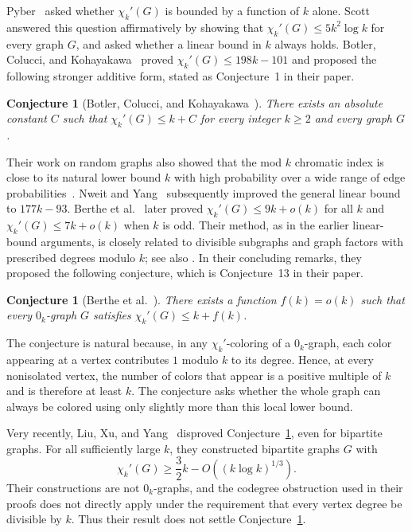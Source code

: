 \documentclass[11pt]{article}
\newtheorem{conjecture}[theorem]{Conjecture}
\newcommand{\chik}{\chi_k'}
\begin{document}
Pyber~\cite{Pyber1992} asked whether $\chik(G)$ is bounded by a function
of $k$ alone. Scott~\cite{Scott1997} answered this question affirmatively
by showing that $\chik(G)\leq5k^2\log k$ for every graph $G$, and asked
whether a linear bound in $k$ always holds. Botler, Colucci, and
Kohayakawa~\cite{BotlerColucciKohayakawa2023} proved
$\chik(G)\leq198k-101$ and proposed the following stronger additive
form, stated as Conjecture~1 in their paper.

\begin{conjecture}[Botler, Colucci, and Kohayakawa~\cite{BotlerColucciKohayakawa2023}]
\label{conj:additive-constant}
There exists an absolute constant $C$ such that
$\chik(G)\leq k+C$ for every integer $k\geq2$ and every graph $G$.
\end{conjecture}

Their work on random graphs also showed that the mod $k$ chromatic index
is close to its natural lower bound $k$ with high probability over a
wide range of edge probabilities~\cite{BotlerColucciKohayakawaRandom2023}.
Nweit and Yang~\cite{NweitYang2024} subsequently improved the general
linear bound to $177k-93$. Berthe et al.~\cite{BertheEtAl2026} later proved
$\chik(G)\leq9k+o(k)$ for all $k$ and $\chik(G)\leq7k+o(k)$ when $k$ is
odd. Their method, as in the earlier linear-bound arguments, is closely
related to divisible subgraphs and graph factors with prescribed
degrees modulo $k$; see also
\cite{AlonFriedlandKalai1984,Mader1972,Thomassen2014}. In their concluding
remarks, they proposed the following conjecture, which is Conjecture~13
in their paper.

\begin{conjecture}[Berthe et al.~\cite{BertheEtAl2026}]\label{conj:berthe}
There exists a function $f(k)=o(k)$ such that every $0_k$-graph $G$
satisfies $\chik(G)\leq k+f(k)$.
\end{conjecture}

The conjecture is natural because, in any $\chi_k'$-coloring of a
$0_k$-graph, each color appearing at a vertex contributes $1$ modulo
$k$ to its degree. Hence, at every nonisolated vertex, the number of
colors that appear is a positive multiple of $k$ and is therefore at
least $k$. The conjecture asks whether the whole graph can always be
colored using only slightly more than this local lower bound.

Very recently, Liu, Xu, and Yang~\cite{LiuXuYang2026} disproved
Conjecture~\ref{conj:additive-constant}, even for bipartite graphs.
For all sufficiently large $k$, they constructed bipartite graphs $G$
with
\[
\chi_k'(G)\geq \frac32 k-O((k\log k)^{1/3}).
\]
Their constructions are not $0_k$-graphs, and the codegree obstruction
used in their proofs does not directly apply under the requirement that
every vertex degree be divisible by $k$. Thus their result does not
settle Conjecture~\ref{conj:berthe}.
\end{document}
